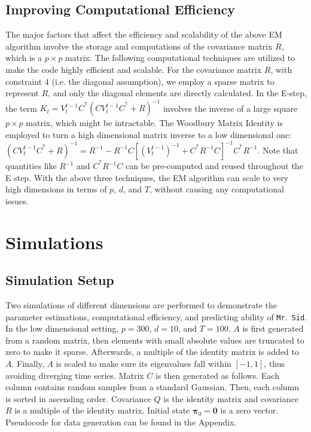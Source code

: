 \documentclass[fleqn,12pt]{article}
\newcommand{\T}{^{\ensuremath{\mathsf{T}}}}           %
\newcommand{\mrsid}{{\sc \texttt{Mr}.~\texttt{Sid}}}
\begin{document}
\subsection{Improving Computational Efficiency}
The major factors that affect the efficiency and scalability of the above EM algorithm involve the storage and computations of the covariance matrix $R$, which is a ${p \times p}$ matrix. The following computational techniques are utilized to make the code highly efficient and scalable.
For the covariance matrix $R$, with constraint 4 (i.e. the diagonal assumption), we employ a sparse matrix to represent $R$, and only the diagonal elements are directly calculated.
In the E-step, the term $K_t=V_t^{t-1}C^{\T}(CV_t^{t-1}C^{\T}+R)^{-1}$ involves the inverse of a large square $p \times p$ matrix, which might be intractable. The Woodbury Matrix Identity is employed to turn a high dimensional matrix inverse to a low dimensional one: $(CV_t^{t-1}C^{\T}+R)^{-1} = R^{-1} - R^{-1}C[(V_t^{t-1})^{-1} + C^{\T}R^{-1}C]^{-1}C^{\T}R^{-1}$.
%
%
%
Note that quantities like $R^{-1}$ and $C^{\T}R^{-1}C$ can be pre-computed and reused throughout the E step. With the above three techniques, the EM algorithm can scale to very high dimensions in terms of $p$, $d$, and $T$, without causing any computational issues.


\section{Simulations}
\subsection{Simulation Setup}
\label{sec:simsetup}
Two simulations of different dimensions are performed to demonstrate the parameter estimations, computational efficiency, and predicting ability of \mrsid.
In the low dimensional setting, $p = 300$, $d = 10$, and $T = 100$. $A$ is first generated from a random matrix, then elements with small absolute values are truncated to zero to make it sparse. Afterwards, a multiple of the identity matrix is added to $A$. Finally, $A$ is scaled to make sure its eigenvalues fall within $[-1,1]$, thus avoiding diverging time series. Matrix $C$ is then generated as follows. Each column contains random samples from a standard Gaussian. Then, each column is sorted in ascending order. Covariance $Q$ is the identity matrix and covariance $R$ is a multiple of the identity matrix. Initial state $\mathbf{\pi}_0 = \mathbf{0}$ is a zero vector. Pseudocode for data generation can be found in the Appendix.
\end{document}
